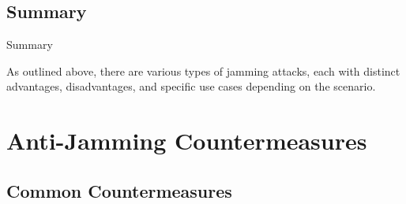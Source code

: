 \documentclass[11pt, aspectratio=169]{beamer}
\begin{document}
\subsection{Summary}

\begin{frame}{Summary}
  \begin{block}{}
    As outlined above, there are various types of jamming attacks, each with distinct advantages, disadvantages, and specific use cases depending on the scenario.
  \end{block}
\end{frame}

\section{Anti-Jamming Countermeasures}

\subsection{Common Countermeasures}
\end{document}
